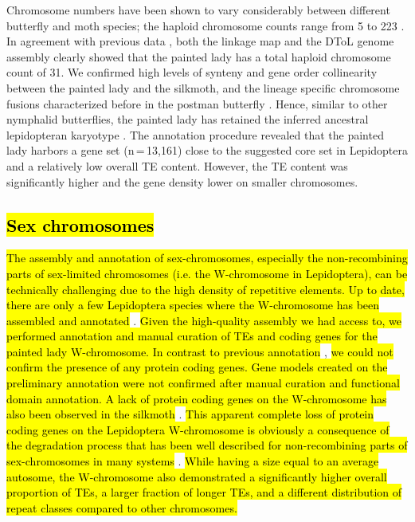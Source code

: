 \documentclass[twocolumn]{bmcart}%
\begin{document}
Chromosome numbers have been shown to vary considerably between different butterfly and moth species; the haploid chromosome counts range from 5 to 223 \cite{lukhtanovBlueButterflyPolyommatus2015, devosSpeciationChromosomalFusion2020}. In agreement with previous data \cite{zhangHighQualityGenomeAssembly2021}, both the linkage map and the DToL genome assembly clearly showed that the painted lady has a total haploid chromosome count of 31. We confirmed high levels of synteny and gene order collinearity between the painted lady and the silkmoth, and the lineage specific chromosome fusions characterized before in the postman butterfly \cite{daveyNoEvidenceMaintenance2017}. Hence, similar to other nymphalid butterflies, the painted lady has retained the inferred ancestral lepidopteran karyotype \cite{aholaGlanvilleFritillaryGenome2014}. The annotation procedure revealed that the painted lady harbors a gene set (n\,=\,13,161) close to the suggested core set in Lepidoptera \cite{challiLepbaseLepidopteranGenome2016, liInsectGenomesProgress2019} and a relatively low overall TE content. However, the TE content was significantly higher and the gene density lower on smaller chromosomes. 

\subsection*{\hl{Sex chromosomes}}

\hl{The assembly and annotation of sex-chromosomes, especially the non-recombining parts of sex-limited chromosomes (i.e. the W-chromosome in Lepidoptera), can be technically challenging due to the high density of repetitive elements. Up to date, there are only a few Lepidoptera species where the W-chromosome has been assembled and annotated} \cite{mitaGenomeSequenceSilkworm2004}. \hl{Given the high-quality assembly we had access to, we performed annotation and manual curation of TEs and coding genes for the painted lady W-chromosome. In contrast to previous annotation }\cite{lohse_genome_2021}, \hl{we could not confirm the presence of any protein coding genes. Gene models created on the preliminary annotation were not confirmed after manual curation and functional domain annotation. A lack of protein coding genes on the W-chromosome has also been observed in the silkmoth} \cite{mitaGenomeSequenceSilkworm2004}. \hl{This apparent complete loss of protein coding genes on the Lepidoptera W-chromosome is obviously a consequence of the degradation process that has been well described for non-recombining parts of sex-chromosomes in many systems} \cite{bachtrogChromosomeEvolutionEmerging2013}. \hl{While having a size equal to an average autosome, the W-chromosome also demonstrated a significantly higher overall proportion of TEs, a larger fraction of longer TEs, and a different distribution of repeat classes compared to other chromosomes.}
\end{document}
